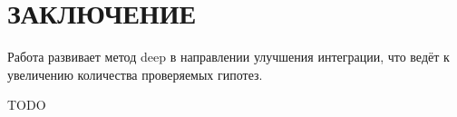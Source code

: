 \chapter*{ЗАКЛЮЧЕНИЕ}

Работа развивает метод deep
в направлении улучшения интеграции,
что ведёт к увеличению количества
проверяемых гипотез.

TODO
